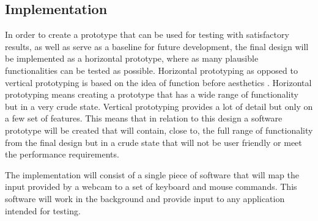 \subsection{Implementation}
In order to create a prototype that can be used for testing with satisfactory results, as well as serve as a baseline for future development, the final design will be implemented as a horizontal prototype, where as many plausible functionalities can be tested as possible. Horizontal prototyping as opposed to vertical prototyping is based on the idea of function before aesthetics \parencite{Rogers2002}. Horizontal prototyping means creating a prototype that has a wide range of functionality but in a very crude state. Vertical prototyping provides a lot of detail but only on a few set of features. This means that in relation to this design a software prototype will be created that will contain, close to, the full range of functionality from the final design but in a crude state that will not be user friendly or meet the performance requirements. 

The implementation will consist of a single piece of software that will map the input provided by a webcam to a set of keyboard and mouse commands. This software will work in the background and provide input to any application intended for testing.
